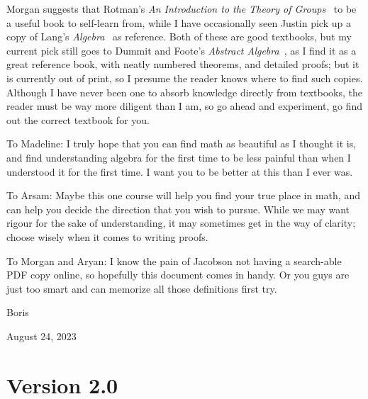 Morgan suggests that Rotman's \textit{An Introduction to the Theory of Groups}~\cite{rotman}
to be a useful book to self-learn from,
while I have occasionally seen Justin
pick up a copy of Lang's \textit{Algebra}~\cite{lang} as reference.
Both of these are good textbooks,
but my current pick still goes to Dummit and Foote's \textit{Abstract Algebra}~\cite{dummitfoote},
as I find it as a great reference book,
with neatly numbered theorems, and detailed proofs;
but it is currently out of print,
so I presume the reader knows where to find such copies.
Although I have never been one to absorb knowledge directly from textbooks,
the reader must be way more diligent than I am,
so go ahead and experiment,
go find out the correct textbook for you.

\medskip

To Madeline:
I truly hope that you can find math as beautiful as I thought it is,
and find understanding algebra for the first time
to be less painful than when I understood it for the first time.
I want you to be better at this than I ever was.

To Arsam:
Maybe this one course will help you find your true place in math,
and can help you decide the direction that you wish to pursue.
While we may want rigour for the sake of understanding,
it may sometimes get in the way of clarity;
choose wisely when it comes to writing proofs.

To Morgan and Aryan:
I know the pain of
Jacobson not having a search-able PDF copy online,
so hopefully this document comes in handy.
Or you guys are just too smart
and can memorize all those definitions first try.

\medskip

Boris

August 24, 2023

\section*{Version 2.0}

